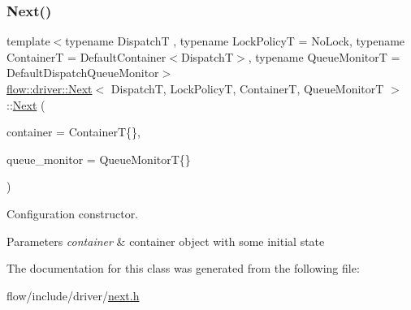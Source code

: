 \subsubsection{\texorpdfstring{Next()}{Next()}}
{\footnotesize\ttfamily template$<$typename DispatchT , typename Lock\+PolicyT  = No\+Lock, typename ContainerT  = Default\+Container$<$\+Dispatch\+T$>$, typename Queue\+MonitorT  = Default\+Dispatch\+Queue\+Monitor$>$ \\
\hyperlink{classflow_1_1driver_1_1_next}{flow\+::driver\+::\+Next}$<$ DispatchT, Lock\+PolicyT, ContainerT, Queue\+MonitorT $>$\+::\hyperlink{classflow_1_1driver_1_1_next}{Next} (\begin{DoxyParamCaption}\item[{const ContainerT \&}]{container = {\ttfamily ContainerT\{\}},  }\item[{const Queue\+MonitorT \&}]{queue\+\_\+monitor = {\ttfamily QueueMonitorT\{\}} }\end{DoxyParamCaption})\hspace{0.3cm}{\ttfamily [explicit]}}



Configuration constructor. 


\begin{DoxyParams}{Parameters}
{\em container} & container object with some initial state \\
\hline
\end{DoxyParams}


The documentation for this class was generated from the following file\+:\begin{DoxyCompactItemize}
\item 
flow/include/driver/\hyperlink{next_8h}{next.\+h}\end{DoxyCompactItemize}
